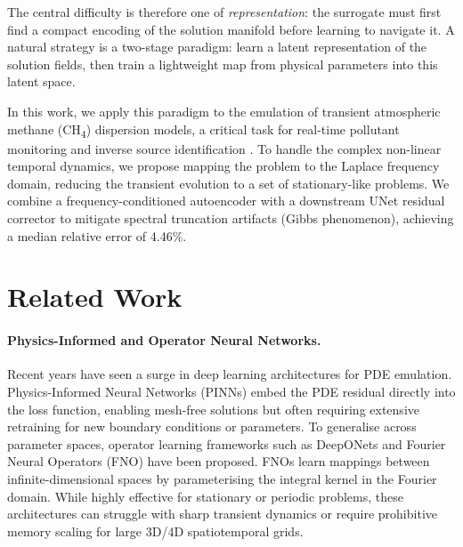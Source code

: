 \documentclass[a4paper, twocolumn]{article}
\begin{document}
The central difficulty is therefore one of \emph{representation}: the surrogate must first find a compact encoding of the solution manifold before learning to navigate it. A natural strategy is a two-stage paradigm: learn a latent representation of the solution fields, then train a lightweight map from physical parameters into this latent space. 

In this work, we apply this paradigm to the emulation of transient atmospheric methane (CH\textsubscript{4}) dispersion models, a critical task for real-time pollutant monitoring and inverse source identification \cite{ammar2024hybrid}. To handle the complex non-linear temporal dynamics, we propose mapping the problem to the Laplace frequency domain, reducing the transient evolution to a set of stationary-like problems. We combine a frequency-conditioned autoencoder with a downstream UNet residual corrector to mitigate spectral truncation artifacts (Gibbs phenomenon), achieving a median relative error of 4.46\%.

\section{Related Work}
\label{sec:related}

\paragraph{Physics-Informed and Operator Neural Networks.}
Recent years have seen a surge in deep learning architectures for PDE emulation. Physics-Informed Neural Networks (PINNs) \cite{raissi2019physics} embed the PDE residual directly into the loss function, enabling mesh-free solutions but often requiring extensive retraining for new boundary conditions or parameters. To generalise across parameter spaces, operator learning frameworks such as DeepONets \cite{lu2021deeponet} and Fourier Neural Operators (FNO) \cite{li2021fno} have been proposed. FNOs learn mappings between infinite-dimensional spaces by parameterising the integral kernel in the Fourier domain. While highly effective for stationary or periodic problems, these architectures can struggle with sharp transient dynamics or require prohibitive memory scaling for large 3D/4D spatiotemporal grids.
\end{document}
